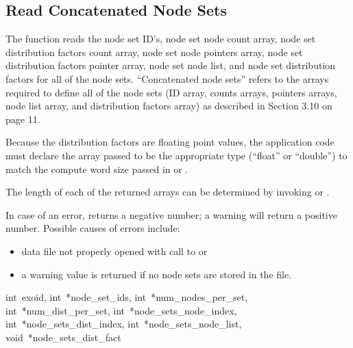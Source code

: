 \subsection{Read Concatenated Node Sets}

The function  reads the node set
ID's, node set node count array, node set distribution factors count
array, node set node pointers array, node set distribution factors
pointer array, node set node list, and node set distribution factors
for all of the node sets. ``Concatenated node sets'' refers to the
arrays required to define all of the node sets (ID array, counts
arrays, pointers arrays, node list array, and distribution factors
array) as described in Section 3.10 on page 11.

Because the distribution factors are floating point values, the
application code must declare the array passed to be the appropriate
type (``float'' or ``double'') to match the compute word size passed
in  or .

The length of each of the returned arrays can be determined by
invoking  or .

In case of an error,  returns a
negative number; a warning will return a positive number. Possible
causes of errors include:
\begin{itemize}

 \item data file not properly opened with call to 
 or 

 \item a warning value is returned if no node sets are stored in the
 file.
\end{itemize}

{int~exoid,
int~*node_set_ids,
int~*num_nodes_per_set,
int~*num_dist_per_set,
int~*node_sets_node_index,
int~*node_sets_dist_index,
int~*node_sets_node_list,
void~*node_sets_dist_fact}


